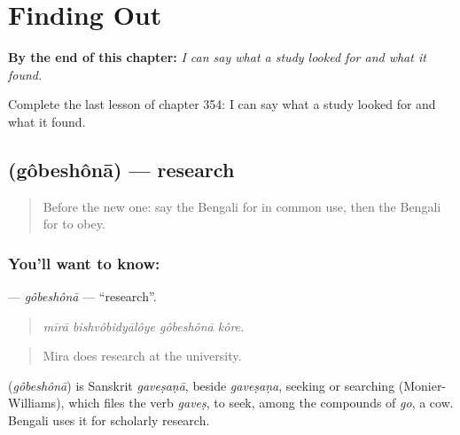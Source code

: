 
\chapter{Finding Out}
\label{ch:bn-finding-out}

\begin{chapteropening}
\textbf{By the end of this chapter:} \emph{I can say what a study looked for and what it found.}

Complete the last lesson of chapter 354: I can say what a study looked for and what it found.
\end{chapteropening}

\section[\texorpdfstring{\bn{গবেষণা} (gôbeshônā)}{গবেষণা (gôbeshônā)}]{ (gôbeshônā) — research}

\label{lesson:BN-C354-gobeshona}



\begin{quote}
Before the new one: say the Bengali for in common use, then the Bengali for to obey.
\end{quote}

\subsection*{You'll want to know: }
\textbf{} — \emph{gôbeshônā} — \textquotedblleft{}research\textquotedblright{}.

\begin{quote}
   
\end{quote}

\begin{quote}
\emph{mīrā bishvôbidyālôye gôbeshônā kôre.}
\end{quote}

\begin{quote}
Mira does research at the university.
\end{quote}

\begin{cousinweb}
\textbf{} (\emph{gôbeshônā}) is Sanskrit \emph{gaveṣaṇā}, beside \emph{gaveṣaṇa}, seeking or searching (Monier-Williams), which files the verb \emph{gaveṣ}, to seek, among the compounds of \emph{go}, a cow. Bengali uses it for scholarly research.
\end{cousinweb}


